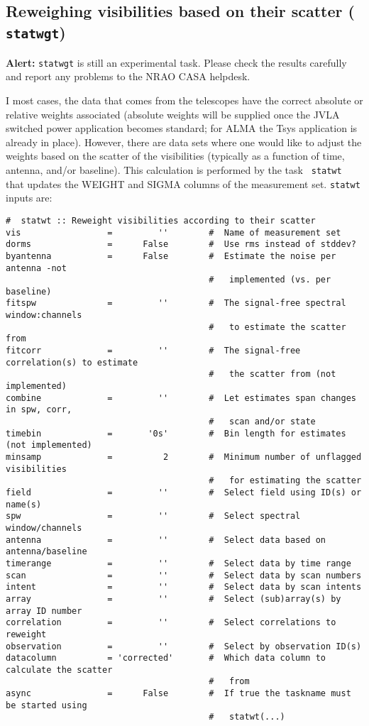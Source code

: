 \subsection{Reweighing visibilities based on their scatter ({\tt
    statwgt})}
\label{section:cal.other.statwt}

{\bf Alert:} {\tt statwgt} is still an experimental task. Please check
the results carefully and report any problems to the NRAO CASA
helpdesk. 

I most cases, the data that comes from the telescopes have the correct
absolute or relative weights associated (absolute weights will be
supplied once the JVLA switched power application becomes standard; for
ALMA the Tsys application is already in place). However, there are
data sets where one would like to adjust the weights based on the
scatter of the visibilities (typically as a function of time, antenna,
and/or baseline). This calculation is performed by the task {\tt
  statwt} that updates the WEIGHT and SIGMA columns of the measurement
set. {\tt statwt} inputs are:

\small
\begin{verbatim} 
#  statwt :: Reweight visibilities according to their scatter
vis                 =         ''        #  Name of measurement set
dorms               =      False        #  Use rms instead of stddev?
byantenna           =      False        #  Estimate the noise per antenna -not
                                        #   implemented (vs. per baseline)
fitspw              =         ''        #  The signal-free spectral window:channels
                                        #   to estimate the scatter from
fitcorr             =         ''        #  The signal-free correlation(s) to estimate
                                        #   the scatter from (not implemented)
combine             =         ''        #  Let estimates span changes in spw, corr,
                                        #   scan and/or state
timebin             =       '0s'        #  Bin length for estimates (not implemented)
minsamp             =          2        #  Minimum number of unflagged visibilities
                                        #   for estimating the scatter
field               =         ''        #  Select field using ID(s) or name(s)
spw                 =         ''        #  Select spectral window/channels
antenna             =         ''        #  Select data based on antenna/baseline
timerange           =         ''        #  Select data by time range
scan                =         ''        #  Select data by scan numbers
intent              =         ''        #  Select data by scan intents
array               =         ''        #  Select (sub)array(s) by array ID number
correlation         =         ''        #  Select correlations to reweight
observation         =         ''        #  Select by observation ID(s)
datacolumn          = 'corrected'       #  Which data column to calculate the scatter
                                        #   from
async               =      False        #  If true the taskname must be started using
                                        #   statwt(...)
\end{verbatim}

